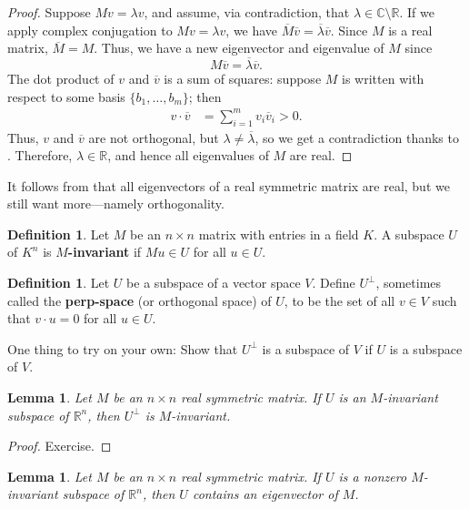 \documentclass[a4paper, 12pt]{article}
\numberwithin{equation}{section}
\numberwithin{figure}{section}
\newtheorem{lem}[thm]{Lemma}
\theoremstyle{definition}
\newtheorem{defn}[thm]{Definition}
\newcommand{\R}{\mathbb{R}}
\newcommand{\C}{\mathbb{C}}
\begin{document}
\begin{proof}
	Suppose $Mv = \lambda v$, and assume, via contradiction, that
	$\lambda\in\C\setminus \R$. If we apply complex conjugation to $Mv = \lambda
	v$, we have $\overline{M}\overline{v} = \overline{\lambda}\overline{v}$.
	Since $M$ is a real matrix, $\overline{M}=M$. Thus, we have a new
	eigenvector and eigenvalue of $M$ since 
	\[ 
		M \overline{v} = \overline{\lambda} \overline{v}. 
	\] 
	The dot product of $v$ and $\overline{v}$ is a sum of squares: suppose $M$
	is written with respect to some basis $\{b_1, \dots, b_m\}$; then 
	\begin{align*}
		v \cdot \overline{v} &= \sum_{i=1}^m v_i\overline{v}_i > 0.
	\end{align*}
	Thus, $v$ and $\overline{v}$ are not orthogonal, but $\lambda\neq
	\overline{\lambda}$, so we get a contradiction thanks to
	. Therefore, $\lambda\in\R$, and hence all
	eigenvalues of $M$ are real. 
\end{proof}

It follows from  that all eigenvectors of a real symmetric
matrix are real, but we still want more---namely orthogonality.

\begin{defn}
	Let $M$ be an $n\times n$ matrix with entries in a field $K$. A subspace $U$
	of $K^n$ is \textbf{$M$-invariant} if $Mu\in U$ for all $u\in U$.
\end{defn}

\begin{defn}
	Let $U$ be a subspace of a vector space $V$. Define $U^{\perp}$, sometimes
	called the \textbf{perp-space} (or orthogonal space) of $U$, to be the set
	of all $v\in V$ such that $v\cdot u = 0$ for all $u\in U$.
\end{defn}

One thing to try on your own: Show that $U^{\perp}$ is a subspace of $V$ if $U$
is a subspace of $V$. 

\begin{lem}\label{lem:perp-inv}
	Let $M$ be an $n\times n$ real symmetric matrix. If $U$ is an $M$-invariant
	subspace of $\R^n$, then $U^{\perp}$ is $M$-invariant.
\end{lem}

\begin{proof}
	Exercise.
\end{proof}

\begin{lem}\label{lem:eigenvector}
	Let $M$ be an $n\times n$ real symmetric matrix. If $U$ is a nonzero
	$M$-invariant subspace of $\R^n$, then $U$ contains an eigenvector of $M$.
\end{lem}
\end{document}
